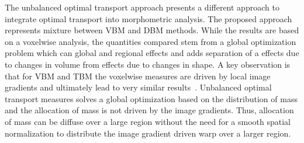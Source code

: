 \documentclass{llncs}
\begin{document}
The unbalanced optimal transport approach presents a different approach to
integrate optimal transport into morphometric analysis. The proposed approach
represents mixture between VBM and DBM methods.  While the results are based
on a voxelwise analysis, the quantities compared stem from a global
optimization problem which can global and regional effects and adds separation
of a effects due to changes in volume from effects due to changes in shape.  A
key observation is that for VBM and TBM the voxelwise measures are driven by
local image gradients and ultimately lead to very similar
results~\citep[Chaper~6]{frackowiak2004human}.  Unbalanced optimal transport
measures solves a global optimization based on the distribution of mass and the
allocation of mass is not driven by the image gradients. Thus, allocation of
mass can be diffuse over a large region without the need for a smooth spatial
normalization to distribute the image gradient driven warp over a larger
region.




\end{document}
